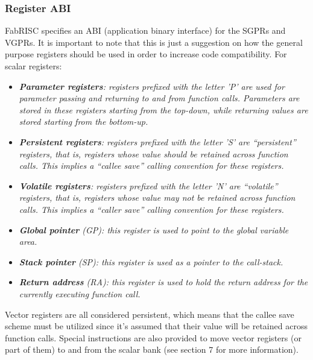 \documentclass{article}
\begin{document}
            \subsubsection{Register ABI}

                FabRISC specifies an ABI (application binary interface) for the SGPRs and VGPRs. It is important to note that this is just a suggestion on how the general purpose registers should be used in order to increase code compatibility. For scalar registers:

                \begin{itemize}

                    \item \textit{\textbf{Parameter registers}: registers prefixed with the letter 'P' are used for parameter passing and returning to and from function calls. Parameters are stored in these registers starting from the top-down, while returning values are stored starting from the bottom-up.}

                    \item \textit{\textbf{Persistent registers}: registers prefixed with the letter 'S' are ``persistent'' registers, that is, registers whose value should be retained across function calls. This implies a ``callee save'' calling convention for these registers.}

                    \item \textit{\textbf{Volatile registers}: registers prefixed with the letter 'N' are ``volatile'' registers, that is, registers whose value may not be retained across function calls. This implies a ``caller save'' calling convention for these registers.}

                    \item \textit{\textbf{Global pointer} (GP): this register is used to point to the global variable area.}
                    \item \textit{\textbf{Stack pointer} (SP): this register is used as a pointer to the call-stack.}
                    \item \textit{\textbf{Return address} (RA): this register is used to hold the return address for the currently executing function call.}

                \end{itemize}

                Vector registers are all considered persistent, which means that the callee save scheme must be utilized since it's assumed that their value will be retained across function calls. Special instructions are also provided to move vector registers (or part of them) to and from the scalar bank (see section 7 for more information).
\end{document}
